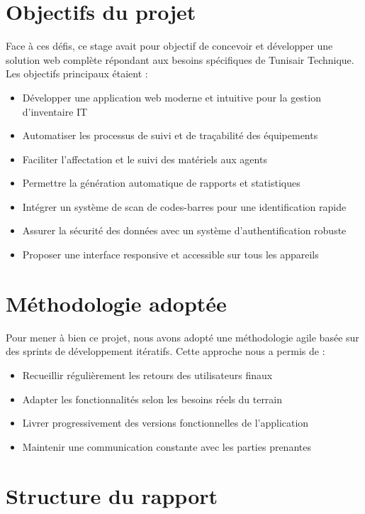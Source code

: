\documentclass[12pt,a4paper]{report}
\begin{document}
\section*{Objectifs du projet}

Face à ces défis, ce stage avait pour objectif de concevoir et développer une solution web complète répondant aux besoins spécifiques de Tunisair Technique. Les objectifs principaux étaient :

\begin{itemize}[leftmargin=*]
    \item Développer une application web moderne et intuitive pour la gestion d'inventaire IT
    \item Automatiser les processus de suivi et de traçabilité des équipements
    \item Faciliter l'affectation et le suivi des matériels aux agents
    \item Permettre la génération automatique de rapports et statistiques
    \item Intégrer un système de scan de codes-barres pour une identification rapide
    \item Assurer la sécurité des données avec un système d'authentification robuste
    \item Proposer une interface responsive et accessible sur tous les appareils
\end{itemize}

\section*{Méthodologie adoptée}

Pour mener à bien ce projet, nous avons adopté une méthodologie agile basée sur des sprints de développement itératifs. Cette approche nous a permis de :

\begin{itemize}[leftmargin=*]
    \item Recueillir régulièrement les retours des utilisateurs finaux
    \item Adapter les fonctionnalités selon les besoins réels du terrain
    \item Livrer progressivement des versions fonctionnelles de l'application
    \item Maintenir une communication constante avec les parties prenantes
\end{itemize}

\section*{Structure du rapport}
\end{document}
